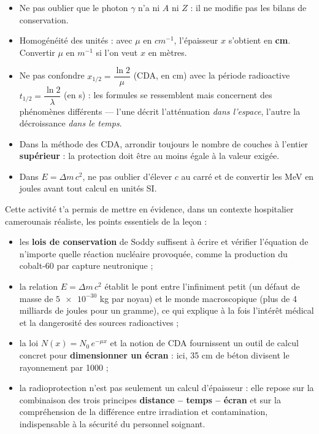 \documentclass[11pt]{article}
\newcounter{popsec}
\newcounter{popsub}
\newcommand{\courssub}[1]{%
  \stepcounter{popsub}%
  \par\vspace{9pt}\noindent{\popxbold\fontsize{11.5}{13}\selectfont\color{popink}{\color{poporange}\thepopsec.\thepopsub}\hspace{6pt}#1}\par\nopagebreak\vspace{4pt}
}
\begin{document}
\begin{attention}
\begin{itemize}
\item Ne pas oublier que le photon $\gamma$ n'a ni $A$ ni $Z$ : il ne modifie pas les bilans de conservation.
\item Homogénéité des unités : avec $\mu$ en $\si{cm^{-1}}$, l'épaisseur $x$ s'obtient en \textbf{cm}. Convertir $\mu$ en $\si{m^{-1}}$ si l'on veut $x$ en mètres.
\item Ne pas confondre $x_{1/2} = \dfrac{\ln 2}{\mu}$ (CDA, en cm) avec la période radioactive $t_{1/2} = \dfrac{\ln 2}{\lambda}$ (en s) : les formules se ressemblent mais concernent des phénomènes différents — l'une décrit l'atténuation \emph{dans l'espace}, l'autre la décroissance \emph{dans le temps}.
\item Dans la méthode des CDA, arrondir toujours le nombre de couches à l'entier \textbf{supérieur} : la protection doit être au moins égale à la valeur exigée.
\item Dans $E = \Delta m\,c^{2}$, ne pas oublier d'élever $c$ au carré et de convertir les MeV en joules avant tout calcul en unités SI.
\end{itemize}
\end{attention}

\courssub{Bilan de l'activité}

Cette activité t'a permis de mettre en évidence, dans un contexte hospitalier camerounais réaliste, les points essentiels de la leçon :

\begin{itemize}
\item les \textbf{lois de conservation} de Soddy suffisent à écrire et vérifier l'équation de n'importe quelle réaction nucléaire provoquée, comme la production du cobalt-60 par capture neutronique ;
\item la relation $E = \Delta m\,c^{2}$ établit le pont entre l'infiniment petit (un défaut de masse de $\num{5e-30}$ kg par noyau) et le monde macroscopique (plus de 4 milliards de joules pour un gramme), ce qui explique à la fois l'intérêt médical et la dangerosité des sources radioactives ;
\item la loi $N(x) = N_{0}\,e^{-\mu x}$ et la notion de CDA fournissent un outil de calcul concret pour \textbf{dimensionner un écran} : ici, 35 cm de béton divisent le rayonnement par 1000 ;
\item la radioprotection n'est pas seulement un calcul d'épaisseur : elle repose sur la combinaison des trois principes \textbf{distance -- temps -- écran} et sur la compréhension de la différence entre irradiation et contamination, indispensable à la sécurité du personnel soignant.
\end{itemize}
\end{document}
